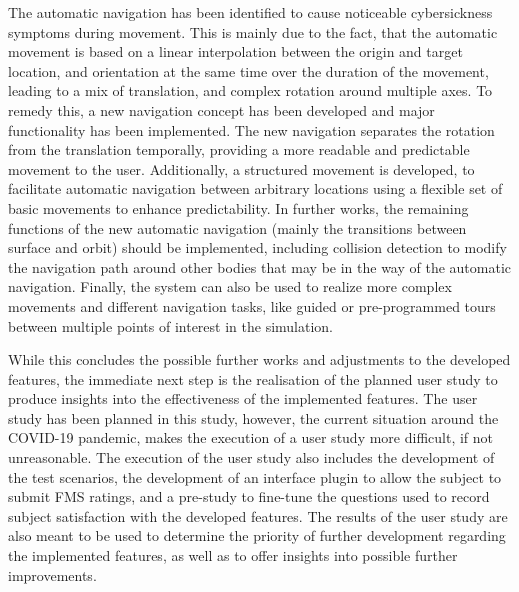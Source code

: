 The automatic navigation has been identified to cause noticeable cybersickness symptoms during movement.
This is mainly due to the fact, that the automatic movement is based on a linear interpolation between the origin and
target location, and orientation at the same time over the duration of the movement, leading to a mix of translation,
and complex rotation around multiple axes.
To remedy this, a new navigation concept has been developed and major functionality has been implemented.
The new navigation separates the rotation from the translation temporally, providing a more readable and predictable
movement to the user.
Additionally, a structured movement is developed, to facilitate automatic navigation between arbitrary locations
using a flexible set of basic movements to enhance predictability.
In further works, the remaining functions of the new automatic navigation (mainly the transitions between surface and
orbit) should be implemented, including collision detection to modify the navigation path around other bodies that may
be in the way of the automatic navigation.
Finally, the system can also be used to realize more complex movements and different navigation tasks, like guided or
pre-programmed tours between multiple points of interest in the simulation.

While this concludes the possible further works and adjustments to the developed features, the immediate next step is
the realisation of the planned user study to produce insights into the effectiveness of the implemented features.
The user study has been planned in this study, however, the current situation around the COVID-19 pandemic, makes the
execution of a user study more difficult, if not unreasonable.
The execution of the user study also includes the development of the test scenarios, the development of an interface
plugin to allow the subject to submit FMS ratings, and a pre-study to fine-tune the questions used to record subject
satisfaction with the developed features.
The results of the user study are also meant to be used to determine the priority of further development regarding
the implemented features, as well as to offer insights into possible further improvements.
